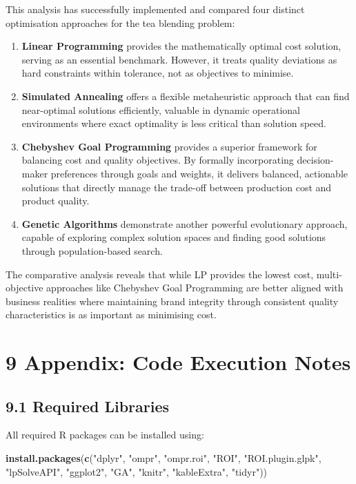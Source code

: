 \documentclass[
]{article}
\newenvironment{Shaded}{\begin{snugshade}}{\end{snugshade}}
\newcommand{\FunctionTok}[1]{\textcolor[rgb]{0.13,0.29,0.53}{\textbf{#1}}}
\newcommand{\NormalTok}[1]{#1}
\newcommand{\StringTok}[1]{\textcolor[rgb]{0.31,0.60,0.02}{#1}}
\begin{document}
This analysis has successfully implemented and compared four distinct
optimisation approaches for the tea blending problem:

\begin{enumerate}
\def\labelenumi{\arabic{enumi}.}
\item
  \textbf{Linear Programming} provides the mathematically optimal cost
  solution, serving as an essential benchmark. However, it treats
  quality deviations as hard constraints within tolerance, not as
  objectives to minimise.
\item
  \textbf{Simulated Annealing} offers a flexible metaheuristic approach
  that can find near-optimal solutions efficiently, valuable in dynamic
  operational environments where exact optimality is less critical than
  solution speed.
\item
  \textbf{Chebyshev Goal Programming} provides a superior framework for
  balancing cost and quality objectives. By formally incorporating
  decision-maker preferences through goals and weights, it delivers
  balanced, actionable solutions that directly manage the trade-off
  between production cost and product quality.
\item
  \textbf{Genetic Algorithms} demonstrate another powerful evolutionary
  approach, capable of exploring complex solution spaces and finding
  good solutions through population-based search.
\end{enumerate}

The comparative analysis reveals that while LP provides the lowest cost,
multi-objective approaches like Chebyshev Goal Programming are better
aligned with business realities where maintaining brand integrity
through consistent quality characteristics is as important as minimising
cost.

\section{9 Appendix: Code Execution
Notes}\label{appendix-code-execution-notes}

\subsection{9.1 Required Libraries}\label{required-libraries}

All required R packages can be installed using:

\begin{Shaded}
\begin{Highlighting}[]
\FunctionTok{install.packages}\NormalTok{(}\FunctionTok{c}\NormalTok{(}\StringTok{"dplyr"}\NormalTok{, }\StringTok{"ompr"}\NormalTok{, }\StringTok{"ompr.roi"}\NormalTok{, }\StringTok{"ROI"}\NormalTok{, }\StringTok{"ROI.plugin.glpk"}\NormalTok{, }
                   \StringTok{"lpSolveAPI"}\NormalTok{, }\StringTok{"ggplot2"}\NormalTok{, }\StringTok{"GA"}\NormalTok{, }\StringTok{"knitr"}\NormalTok{, }\StringTok{"kableExtra"}\NormalTok{, }\StringTok{"tidyr"}\NormalTok{))}
\end{Highlighting}
\end{Shaded}
\end{document}
